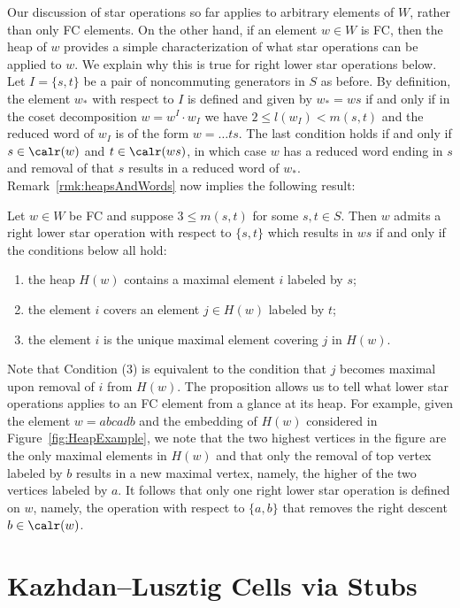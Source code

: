 \noindent
Our discussion of star operations so far applies to arbitrary elements of $W$, rather than only FC elements. On the
other hand, if an element $w\in W$ is FC, then the heap of $w$ provides a simple characterization of what star
operations can be applied to $w$. We explain why this is true for right lower star operations below. Let
$I=\{s,t\}$ be a pair of noncommuting generators in $S$ as before. By definition, the element $w_*$ with respect to
$I$ is defined and given by $w_*=ws$ if and only if in the coset decomposition $w=w^I\cdot w_I$ we have $2 \le
l(w_I)< m(s,t)$ and the reduced word of $w_I$ is of the form  $w=\dots ts$. The last condition holds if and only if
$s \in\calr(w)$ and $t\in \calr(ws)$, in which case $w$ has a reduced word ending in $s$ and removal of that $s$
results in a reduced word of $w_*$. Remark~\ref{rmk:heapsAndWords} now implies the following result:
\begin{prop}
    \label{prop:Reducibility} Let $w\in W$ be FC and suppose $3\le m(s,t)$ for some $s,t\in S$.  Then $w$ admits a
          right lower star operation with respect to $\{s,t\}$ which results in $ws$ if and only if the conditions
          below all hold:
    \begin{enumerate}
        \item the heap $H(w)$ contains a maximal element $i$ labeled by $s$;
        \item the element $i$ covers an element $j\in H(w)$ labeled by $t$;
        \item the element $i$ is the unique maximal element covering $j$ in $H(w)$.
    \end{enumerate}
\end{prop}

\noindent 
Note that Condition (3) is equivalent to the condition that $j$ becomes maximal upon removal of $i$ from $H(w)$.
The proposition allows us to tell what lower star operations applies to an FC element from a glance at its heap.
For example, given the element $w=abcadb$ and the embedding of $H(w)$ considered in Figure~\ref{fig:HeapExample},
we note that the two highest vertices in the figure are the only maximal elements in $H(w)$ and that only the
removal of top vertex labeled by $b$ results in a new maximal vertex, namely, the higher of the two vertices
labeled by $a$. It follows that only one right lower star operation is defined on $w$, namely, the operation with
respect to $\{a,b\}$ that removes the right descent $b\in \calr(w)$. 

\section{Kazhdan--Lusztig Cells via Stubs}
\label{KLcells}

